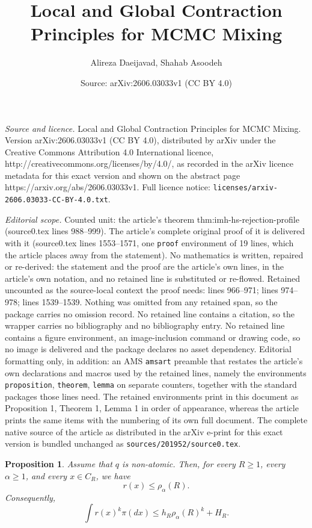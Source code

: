\documentclass[10pt,a4paper]{amsart}
\title{Local and Global Contraction Principles for MCMC Mixing}
\author{Alireza Daeijavad, Shahab Asoodeh}
\date{Source: arXiv:2606.03033v1 (CC BY 4.0)}
\newtheorem{proposition}{Proposition}
\begin{document}
\maketitle

\noindent\emph{Source and licence.} Local and Global Contraction Principles for MCMC Mixing. Version arXiv:2606.03033v1 (CC BY 4.0), distributed by arXiv under the Creative Commons Attribution 4.0 International licence, http://creativecommons.org/licenses/by/4.0/, as recorded in the arXiv licence metadata for this exact version and shown on the abstract page https://arxiv.org/abs/2606.03033v1. Full licence notice: \texttt{licenses/arxiv-2606.03033-CC-BY-4.0.txt}.\par\smallskip

\noindent\textit{Editorial scope.} Counted unit: the article's theorem thm:imh-hs-rejection-profile (source0.tex lines 988--999). The article's complete original proof of it is delivered with it (source0.tex lines 1553--1571, one \texttt{proof} environment of 19 lines, which the article places away from the statement). No mathematics is written, repaired or re-derived: the statement and the proof are the article's own lines, in the article's own notation, and no retained line is substituted or re-flowed.  Retained uncounted as the source-local context the proof needs: lines 966--971; lines 974--978; lines 1539--1539.  Nothing was omitted from any retained span, so the package carries no omission record.  No retained line contains a citation, so the wrapper carries no bibliography and no bibliography entry.  No retained line contains a figure environment, an image-inclusion command or drawing code, so no image is delivered and the package declares no asset dependency.  Editorial formatting only, in addition: an AMS \texttt{amsart} preamble that restates the article's own declarations and macros used by the retained lines, namely the environments \texttt{proposition}, \texttt{theorem}, \texttt{lemma} on separate counters, together with the standard packages those lines need.  The retained environments print in this document as Proposition 1, Theorem 1, Lemma 1 in order of appearance, whereas the article prints the same items with the numbering of its own full document.  The complete native source of the article as distributed in the arXiv e-print for this exact version is bundled unchanged as \texttt{sources/201952/source0.tex}.
\begin{proposition}
\label{prop:rho-controls-rejection}
Assume that $q$ is non-atomic. Then, for every $R\ge 1$, every $\alpha\ge 1$, and every $x\in C_R$, we have $$r(x)\le \rho_\alpha(R).$$
Consequently,
$$\int r(x)^k\pi(dx)\le h_R\rho_\alpha(R)^k+H_R.$$
\end{proposition}
\end{document}
